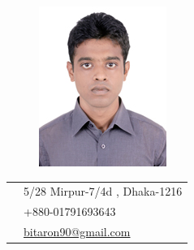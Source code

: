 \documentclass[10pt]{article} %
\begin{document}
{\begin{minipage}[t]{0.44\textwidth}
\begin{minipage}[t]{0.3\textwidth}
{\raggedleft\begin{figure}[H]
	\includegraphics[width=\textwidth]{pic.jpg}
\end{figure}}
\end{minipage} %

\begin{minipage}[t]{0.44\textwidth} %
\vspace{0pt} 
{\raggedright	
\colorbox{shade}{\textcolor{text1}{
\begin{tabular}{c|p{7cm}}
\raisebox{-4pt}{\textifsymbol{18}} & 5/28 Mirpur-7/4d , Dhaka-1216 \\ %
\raisebox{-3pt}{\Mobilefone} & +880-01791693643 \\ %
\raisebox{-1pt}{\Letter} & \href{mailto:bitaron90@gmail.com}{bitaron90@gmail.com} \\ %
\end{tabular}
}
}\\[10pt]
}
\end{minipage}


\end{minipage}}
\end{document}
